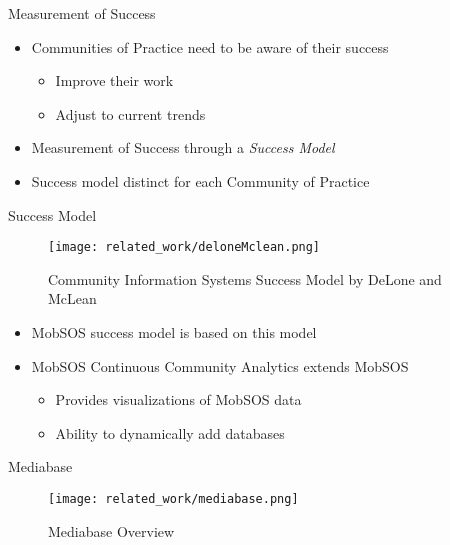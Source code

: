 \begin{frame}{Measurement of Success}
  \begin{itemize}
    \item Communities of Practice need to be aware of their success
          \begin{itemize}
            \item Improve their work
            \item Adjust to current trends
          \end{itemize}
    \item Measurement of Success through a \emph{Success Model}
    \item Success model distinct for each Community of Practice %

  \end{itemize}
\end{frame}
\begin{frame}{Success Model}
  \begin{figure}[!h]
    \centering
    \texttt{[image: related\_work/deloneMclean.png]}
    \caption{Community Information Systems Success Model by DeLone and McLean \cite{DeMc92}}
    \label{CISModel}
  \end{figure}
  \begin{itemize}
    \item MobSOS success model is based on this model
    \item MobSOS Continuous Community Analytics extends MobSOS
          \begin{itemize}
            \item Provides visualizations of MobSOS data
            \item Ability to dynamically add databases
          \end{itemize}
  \end{itemize}
\end{frame}

\begin{frame}{Mediabase}
  \begin{figure}[h]
    \centering
    \texttt{[image: related\_work/mediabase.png]}
    \caption{Mediabase Overview \cite{Klam10e}}
  \end{figure}
\end{frame}

